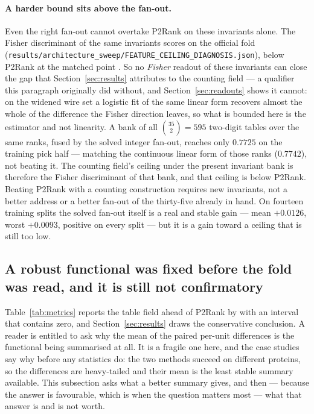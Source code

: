 \documentclass[11pt]{article}
\begin{document}
\paragraph{A harder bound sits above the fan-out.} Even the right fan-out cannot
overtake P2Rank on these invariants alone. The Fisher discriminant of the same
\NAlgFeatures{} invariants scores \FisherAll{} on the official fold
(\texttt{results/architecture\_sweep/FEATURE\_CEILING\_DIAGNOSIS.json}), below
P2Rank at the matched point \AlgAucMatchedBase{}. So no \emph{Fisher} readout of
these invariants can close the gap that Section~\ref{sec:results} attributes to
the counting field --- a qualifier this paragraph originally did without, and
Section~\ref{sec:readouts} shows it cannot: on the widened wire set a logistic
fit of the same linear form recovers almost the whole of the difference the
Fisher direction leaves, so what is bounded here is the estimator and not
linearity. A bank of all $\binom{35}{2}=595$ two-digit tables over the
same ranks, fused by the solved integer fan-out, reaches only $0.7725$ on the
training pick half --- matching the continuous linear form of those ranks
($0.7742$), not beating it. The counting field's ceiling under the present
invariant bank is therefore the Fisher discriminant of that bank, and that
ceiling is below P2Rank. Beating P2Rank with a counting construction requires
new invariants, not a better address or a better fan-out of the thirty-five
already in hand. On fourteen training splits the solved fan-out itself is a real
and stable gain --- mean $+0.0126$, worst $+0.0093$, positive on every split ---
but it is a gain toward a ceiling that is still too low.

\subsection{A robust functional was fixed before the fold was read, and it is
still not confirmatory}
\label{sec:prereg}
Table~\ref{tab:metrics} reports the table field ahead of P2Rank by \TabAucD{}
with an interval that contains zero, and Section~\ref{sec:results} draws the
conservative conclusion. A reader is entitled to ask why the mean of the paired
per-unit differences is the functional being summarised at all. It is a fragile
one here, and the case studies say why before any statistics do: the two methods
succeed on different proteins, so the differences are heavy-tailed and their
mean is the least stable summary available. This subsection asks what a better
summary gives, and then --- because the answer is favourable, which is when the
question matters most --- what that answer is and is not worth.
\end{document}
